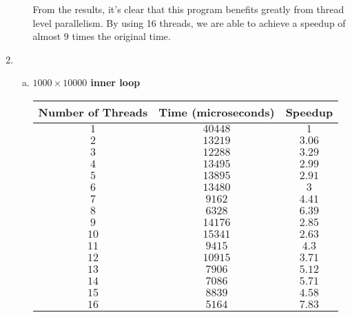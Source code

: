\documentclass[10pt]{article} %
\begin{document}
\begin{enumerate}[1.]
\begin{enumerate}[(a)]
From the results, it's clear that this program benefits greatly from thread level parallelism.  By using 16 threads, we are able to achieve a speedup of almost $9$ times the original time.  

\end{enumerate}

\newpage

\item %
\begin{enumerate}[(a)]
\item %

\textbf{$1000 \times 10000$ inner loop}
\begin{center}
\begin{tabular}{| c | c | c |}
\hline
Number of Threads & Time (microseconds) & Speedup \\
\hline
$1$ & $40448$ & $1$ \\
$2$ & $13219$ & $3.06$ \\
$3$ & $12288$ & $3.29$ \\
$4$ & $13495$ & $2.99$ \\
$5$ & $13895$ & $2.91$ \\
$6$ & $13480$ & $3$ \\
$7$ & $9162$ & $4.41$ \\
$8$ & $6328$ & $6.39$ \\
$9$ & $14176$ & $2.85$ \\
$10$ & $15341$ & $2.63$ \\
$11$ & $9415$ & $4.3$ \\
$12$ & $10915$ & $3.71$ \\
$13$ & $7906$ & $5.12$ \\
$14$ & $7086$ & $5.71$ \\
$15$ & $8839$ & $4.58$ \\
$16$ & $5164$ & $7.83$ \\
\hline
\end{tabular}
\end{center}


\end{enumerate}
\end{enumerate}
\end{document}
